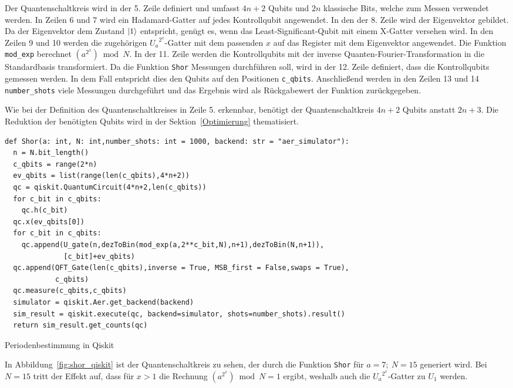 Der Quantenschaltkreis wird in der 5. Zeile definiert und umfasst \(4n+2\) Qubits und 
\(2n\) klassische Bits, welche zum Messen verwendet werden.
In Zeilen 6 und 7 wird ein Hadamard-Gatter auf jedes Kontrollqubit angewendet.
In den der 8. Zeile wird der Eigenvektor gebildet. 
Da der Eigenvektor dem Zustand \(\ket{1}\) entspricht,
genügt es, wenn das Least-Significant-Qubit mit einem X-Gatter versehen wird.
In den Zeilen 9 und 10 werden die zugehörigen \({U_a}^{2^x}\)-Gatter mit dem passenden \(x\) auf das Register mit dem Eigenvektor angewendet.
Die Funktion \texttt{mod_exp} berechnet \((a^{2^x})\bmod N\).
In der 11. Zeile werden die Kontrollqubits mit der inverse Quanten-Fourier-Transformation in die Standardbasis transformiert.  
Da die Funktion \texttt{Shor} Messungen durchführen soll, 
wird in der 12. Zeile definiert, dass die Kontrollqubits gemessen werden.
In dem Fall entspricht dies den Qubits auf den Positionen \texttt{c_qbits}.
Anschließend werden in den Zeilen 13 und 14 \texttt{number_shots} viele Messungen durchgeführt und 
das Ergebnis wird als Rückgabewert der Funktion zurückgegeben.

Wie bei der Definition des Quantenschaltkreises in Zeile 5. erkennbar, 
benötigt der Quantenschaltkreis \(4n+2\) Qubits anstatt \(2n+3\).
Die Reduktion der benötigten Qubits wird in der Sektion~\ref{Optimierung} thematisiert. 

\begin{listing}[H]
\begin{verbatim}  
def Shor(a: int, N: int,number_shots: int = 1000, backend: str = "aer_simulator"):
  n = N.bit_length()
  c_qbits = range(2*n)
  ev_qbits = list(range(len(c_qbits),4*n+2))
  qc = qiskit.QuantumCircuit(4*n+2,len(c_qbits)) 
  for c_bit in c_qbits:
    qc.h(c_bit)
  qc.x(ev_qbits[0])
  for c_bit in c_qbits:
    qc.append(U_gate(n,dezToBin(mod_exp(a,2**c_bit,N),n+1),dezToBin(N,n+1)),
              [c_bit]+ev_qbits)
  qc.append(QFT_Gate(len(c_qbits),inverse = True, MSB_first = False,swaps = True),
            c_qbits)
  qc.measure(c_qbits,c_qbits)
  simulator = qiskit.Aer.get_backend(backend)
  sim_result = qiskit.execute(qc, backend=simulator, shots=number_shots).result()
  return sim_result.get_counts(qc)
  \end{verbatim}
  \caption{Periodenbestimmung in Qiskit}
  \label{code:Periodenbestimmung}
\end{listing}

In Abbildung~\ref{fig:shor_qiskit} ist der Quantenschaltkreis zu sehen, 
der durch die Funktion \texttt{Shor} für \(a=7;~N=15\) generiert wird.
Bei \(N=15\) tritt der Effekt auf, dass für \(x>1\) die Rechnung \((a^{2^x})\bmod N = 1\) ergibt, 
weshalb auch die \({U_a}^{2^x}\)-Gatter zu \(U_1\) werden.

